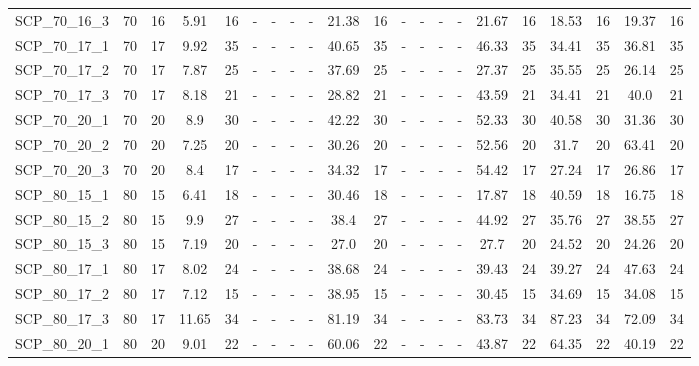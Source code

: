 \begin{sidewaystable}[!ht]
{\begin{tabular}{lcccccccccccccccccccc}
SCP\_70\_16\_3 & 70 & 16 &  \textcolor{blue2}{5.91} & 16 &  - &  - &  - &  - & 21.38 & 16 &  - &  - &  - &  - & 21.67 & 16 & 18.53 & 16 & 19.37 & 16 \\
SCP\_70\_17\_1 & 70 & 17 &  \textcolor{blue2}{9.92} & 35 &  - &  - &  - &  - & 40.65 & 35 &  - &  - &  - &  - & 46.33 & 35 & 34.41 & 35 & 36.81 & 35 \\
SCP\_70\_17\_2 & 70 & 17 &  \textcolor{blue2}{7.87} & 25 &  - &  - &  - &  - & 37.69 & 25 &  - &  - &  - &  - & 27.37 & 25 & 35.55 & 25 & 26.14 & 25 \\
SCP\_70\_17\_3 & 70 & 17 &  \textcolor{blue2}{8.18} & 21 &  - &  - &  - &  - & 28.82 & 21 &  - &  - &  - &  - & 43.59 & 21 & 34.41 & 21 & 40.0 & 21 \\
SCP\_70\_20\_1 & 70 & 20 &  \textcolor{blue2}{8.9} & 30 &  - &  - &  - &  - & 42.22 & 30 &  - &  - &  - &  - & 52.33 & 30 & 40.58 & 30 & 31.36 & 30 \\
SCP\_70\_20\_2 & 70 & 20 &  \textcolor{blue2}{7.25} & 20 &  - &  - &  - &  - & 30.26 & 20 &  - &  - &  - &  - & 52.56 & 20 & 31.7 & 20 & 63.41 & 20 \\
SCP\_70\_20\_3 & 70 & 20 &  \textcolor{blue2}{8.4} & 17 &  - &  - &  - &  - & 34.32 & 17 &  - &  - &  - &  - & 54.42 & 17 & 27.24 & 17 & 26.86 & 17 \\
SCP\_80\_15\_1 & 80 & 15 &  \textcolor{blue2}{6.41} & 18 &  - &  - &  - &  - & 30.46 & 18 &  - &  - &  - &  - & 17.87 & 18 & 40.59 & 18 & 16.75 & 18 \\
SCP\_80\_15\_2 & 80 & 15 &  \textcolor{blue2}{9.9} & 27 &  - &  - &  - &  - & 38.4 & 27 &  - &  - &  - &  - & 44.92 & 27 & 35.76 & 27 & 38.55 & 27 \\
SCP\_80\_15\_3 & 80 & 15 &  \textcolor{blue2}{7.19} & 20 &  - &  - &  - &  - & 27.0 & 20 &  - &  - &  - &  - & 27.7 & 20 & 24.52 & 20 & 24.26 & 20 \\
SCP\_80\_17\_1 & 80 & 17 &  \textcolor{blue2}{8.02} & 24 &  - &  - &  - &  - & 38.68 & 24 &  - &  - &  - &  - & 39.43 & 24 & 39.27 & 24 & 47.63 & 24 \\
SCP\_80\_17\_2 & 80 & 17 &  \textcolor{blue2}{7.12} & 15 &  - &  - &  - &  - & 38.95 & 15 &  - &  - &  - &  - & 30.45 & 15 & 34.69 & 15 & 34.08 & 15 \\
SCP\_80\_17\_3 & 80 & 17 &  \textcolor{blue2}{11.65} & 34 &  - &  - &  - &  - & 81.19 & 34 &  - &  - &  - &  - & 83.73 & 34 & 87.23 & 34 & 72.09 & 34 \\
SCP\_80\_20\_1 & 80 & 20 &  \textcolor{blue2}{9.01} & 22 &  - &  - &  - &  - & 60.06 & 22 &  - &  - &  - &  - & 43.87 & 22 & 64.35 & 22 & 40.19 & 22 \\

\end{tabular}}
\end{sidewaystable}
